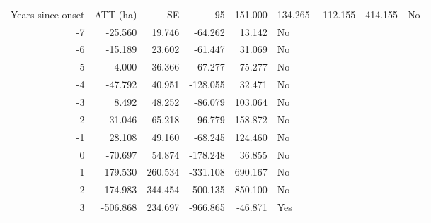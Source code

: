 \begin{tabular}{rrrrrl}
\toprule
Years since onset & ATT (ha) & SE & 95%
 & 151.000 & 134.265 & -112.155 & 414.155 & No \\
-7 & -25.560 & 19.746 & -64.262 & 13.142 & No \\
-6 & -15.189 & 23.602 & -61.447 & 31.069 & No \\
-5 & 4.000 & 36.366 & -67.277 & 75.277 & No \\
-4 & -47.792 & 40.951 & -128.055 & 32.471 & No \\
-3 & 8.492 & 48.252 & -86.079 & 103.064 & No \\
-2 & 31.046 & 65.218 & -96.779 & 158.872 & No \\
-1 & 28.108 & 49.160 & -68.245 & 124.460 & No \\
0 & -70.697 & 54.874 & -178.248 & 36.855 & No \\
1 & 179.530 & 260.534 & -331.108 & 690.167 & No \\
2 & 174.983 & 344.454 & -500.135 & 850.100 & No \\
3 & -506.868 & 234.697 & -966.865 & -46.871 & Yes \\
\bottomrule
\end{tabular}
